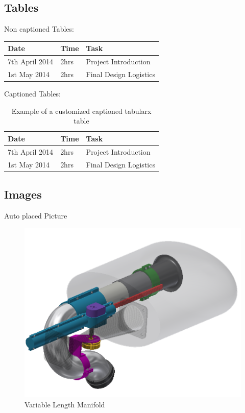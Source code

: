 \documentclass[12pt]{article}
\numberwithin{equation}{section} %
\numberwithin{figure}{section} %
\numberwithin{table}{section} %
\begin{document}
\begin{appendices}
\subsection{Tables}

Non captioned Tables:
 \begin{table}[htbp]
 \begin{tabularx}{1\linewidth}{ | l || l | X | } 
  \hline 
  Date & Time & Task \\
  \hline 
  7th April 2014 & 2hrs & Project Introduction\\
  1st May 2014 & 2hrs & Final Design Logistics\\
  \hline
\end{tabularx}
\end{table}

Captioned Tables:
\begin{table}[htbp]
 \centering
  \begin{tabularx}{1\linewidth}{ | l || l | X | } 
  \hline 
  Date & Time & Task \\
  \hline 
  7th April 2014 & 2hrs & Project Introduction\\
  1st May 2014 & 2hrs & Final Design Logistics\\
  \hline
  \end{tabularx}
  \caption{Example of a customized captioned tabularx table}
\end{table}
\vspace {10mm}


\subsection{Images}

Auto placed Picture \\
\begin{figure}[ht] 
  \centering
  \includegraphics[width=0.5\linewidth] 
      {./figures/example/VLIM.png} 
  \caption{Variable Length Manifold} 
  \label{fig:vlim}
\end{figure}



\end{appendices}
\end{document}
